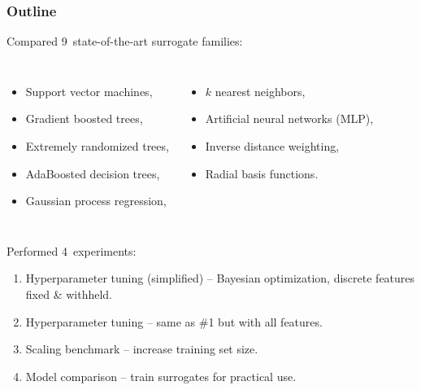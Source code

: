 \begin{frame}
	\frametitle{Outline}
	Compared 9~state-of-the-art surrogate families:

	\begin{columns}[T]
		\begin{itemize}
			\item Support vector machines,
			\item Gradient boosted trees,
			\item Extremely randomized trees,
			\item AdaBoosted decision trees,
			\item Gaussian process regression,
		\end{itemize}

		\begin{itemize}
			\item $k$ nearest neighbors,
			\item Artificial neural networks (MLP),
			\item Inverse distance weighting,
			\item Radial basis functions.
		\end{itemize}
	\end{columns}

	\vspace{2em}

	Performed 4~experiments:
	\begin{enumerate}
		\item
			Hyperparameter tuning (simplified) -- Bayesian optimization,
			discrete features fixed \& withheld.
		\item
			Hyperparameter tuning -- same as \#1 but with all features.
		\item
			Scaling benchmark -- increase training set size.
		\item
			Model comparison -- train surrogates for practical use.
	\end{enumerate}
\end{frame}

